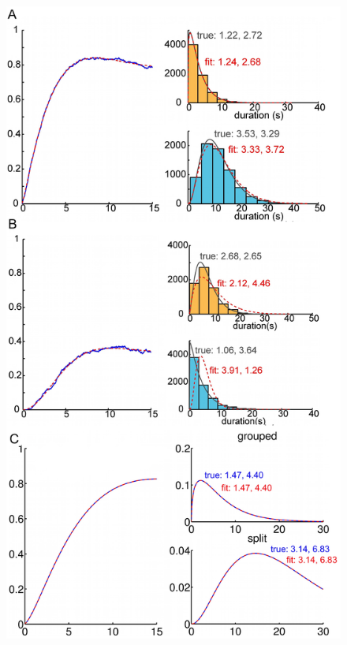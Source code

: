 \begin{figure}
	\centering
	\includegraphics[scale=.8]{ch2Figs/6-reverse_fits_all.jpg}

\end{figure}
